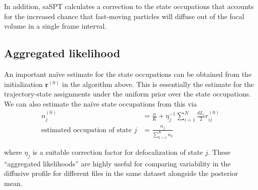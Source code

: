 \documentclass{article}
\renewcommand{\vec}{\mathbf}
\begin{document}
In addition, saSPT calculates a correction to the state occupations that accounts for the 
increased chance that fast-moving particles will diffuse out of the focal volume in a single
frame interval.

\subsection{Aggregated likelihood}

An important na{\"i}ve estimate for the state occupations can be obtained from the initialization
$\vec{r}^{(0)}$ in the algorithm above. This is essentially the estimate for the trajectory-state
assignments under the uniform prior over the state occupations. We can also estimate the 
na{\"i}ve state occupations from this via
\begin{align*}
	n_{j}^{(0)} &= \frac{\alpha}{K} + \eta_{j}^{-1} \sum\limits_{i=1}^{N} \frac{d L_{i}}{2} r_{ij}^{(0)} \\
	\text{estimated occupation of state $j$} &= \frac{n_{j}}{\sum\limits_{k=1}^{K} n_{k}} 
\end{align*}

where $\eta_{j}$ is a suitable correction factor for defocalization of state $j$.
These ``aggregated likelihoods'' are highly useful for comparing variability in the diffusive
profile for different files in the same dataset alongside the posterior mean.
\end{document}
